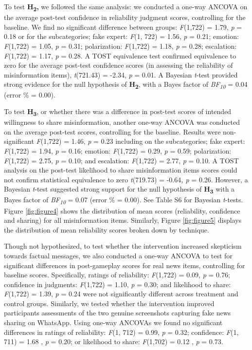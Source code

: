 \documentclass[empirical, authordate, issue]{jote-new-article}
\begin{document}
To test \textbf{H}\textsubscript{\textbf{2}}\textbf{, }we followed the same analysis: we conducted a one-way ANCOVA on the average post-test confidence in reliability judgment scores, controlling for the baseline. We find no significant difference between groups: \emph{F}(1,722) = 1.79,\emph{ p} = 0.18 or for the subcategories; fake expert: \emph{F}(1, 722) = 1.56, \emph{p} = 0.21; emotion: \emph{F}(1,722) = 1.05, \emph{p} = 0.31; polarization: \emph{F}(1,722) = 1.18, \emph{p} = 0.28; escalation: \emph{F}(1,722) = 1.17, \emph{p} = 0.28. A TOST equivalence test confirmed equivalence to zero for the average post-test confidence scores (in assessing the reliability of misinformation items), \emph{t}(721.43) = -2.34, \emph{p }= 0.01. A Bayesian \emph{t}-test provided strong evidence for the null hypothesis of \textbf{H}\textsubscript{\textbf{2}}, with a Bayes factor of \emph{BF}\textsubscript{\emph{10 }}= 0.04 (error \% = 0.00).\textbf{ }

To test \textbf{H}\textsubscript{\textbf{3}}, or whether there was a difference in post-test scores of intended willingness to share misinformation, another one-way ANCOVA was conducted on the average post-test scores, controlling for the baseline. Results were non-significant \emph{F}(1,722) = 1.46, \emph{p }= 0.23 including on the subcategories; fake expert: \emph{F}(1,722) = 1.94, \emph{p }= 0.16; emotion: \emph{F}(1,722) = 0.29, \emph{p} = 0.59; polarization: \emph{F}(1,722) = 2.75, \emph{p} = 0.10; and escalation: \emph{F}(1,722) = 2.77, \emph{p} = 0.10. A TOST analysis on the post-test likelihood to share misinformation items scores could not confirm statistical equivalence to zero \emph{t}(719.73) = -0.64\emph{, p} = 0.26. However, a Bayesian \emph{t}-test suggested strong support for the null hypothesis of \textbf{H}\textsubscript{\textbf{3}}\textbf{ }with\textbf{ }a\textbf{ }Bayes factor of \emph{BF}\textsubscript{\emph{10}} = 0.07 (error \% = 0.00). See Table S6 for Bayesian \emph{t}-tests. Figure \ref{fig:figure4} shows the distribution of mean scores (reliability, confidence and sharing) for all misinformation items. Similarly, Figure \ref{fig:figure5} displays the distribution of mean reliability scores broken down by technique.

Though not hypothesized, to test whether the intervention increased skepticism towards factual messages, we also conducted a one-way ANCOVA to test for significant differences in post-gameplay scores for real news items, controlling for baseline scores. Specifically, ratings of reliability: \emph{F}(1,722) = 0.09, \emph{p} = 0.76; confidence in judgments: \emph{F}(1,722) = 1.10, \emph{p} = 0.30; and likelihood to share: \emph{F}(1,722) = 1.39, \emph{p }= 0.24 were not significantly different across treatment and control groups. Similarly, we tested whether the intervention improved participants assessments of the two genuine screenshots capturing fake news sharing on \mbox{WhatsApp}. Using one-way ANCOVAs we found no significant differences in ratings of reliability: \emph{F}(1, 712) = 0.99, \emph{p} = 0.32; confidence: \emph{F}(1, 711) = 1.68 , \emph{p }= 0.20; or likelihood to share: \emph{F}(1,702) = 0.12 , \emph{p }= 0.73.
\end{document}
